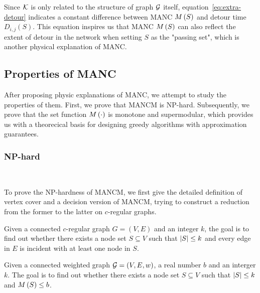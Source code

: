 \documentclass[sigconf]{acmart}
\begin{document}
Since \(\mathcal{K}\) is only related to the structure of graph \(\mathcal{G}\) itself, equation~\eqref{eq:extra-detour} indicates a constant difference between MANC \(M\left(S\right)\) and detour time \(D_{i,j}(S)\).
This equation inspires us that MANC \(M\left(S\right)\) can also reflect the extent of detour in the network when setting \(S\) as the "passing set", which is another physical explanation of MANC.

\subsection{Properties of MANC}

After proposing physic explanations of MANC, we attempt to study the properties of them. First, we prove that MANCM is NP-hard.
Subsequently, we prove that the set function \(M\left(\cdot\right)\) is monotone and supermodular, which provides us with a theorecical basis for designing greedy algorithms with approximation guarantees.

\subsubsection{NP-hard}

\

To prove the NP-hardness of MANCM, we first give the detailed definition of vertex cover and a decision version of MANCM, trying to construct a reduction from the former to the latter on \(c\)-regular graphs.

\begin{problem}
Given a connected \(c\)-regular graph \(G=(V,E)\) and an integer \(k\), the goal is to find out whether there exists a node set \(S\subseteq V\) such that \(\left|S \right|\le k\) and every edge in \(E\) is incident with at least one node in \(S\).
\end{problem}

\begin{problem}
Given a connected weighted graph \(\mathcal{G}=(V,E,w)\), a real number \(b\) and an interger \(k\).
The goal is to find out whether there exists a node set \(S\subseteq V\) such that \(\left|S \right|\le k\) and \(M\left(S\right)\le b\).
\end{problem}
\end{document}
